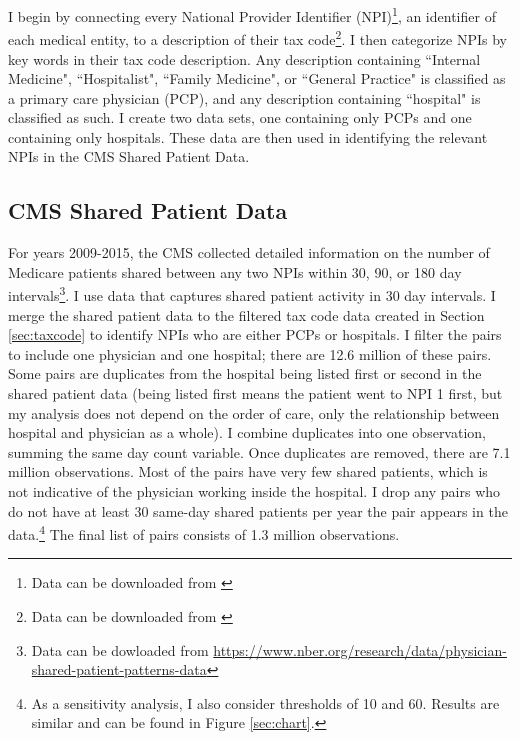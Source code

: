\documentclass[12pt]{article}
\begin{document}
I begin by connecting every National Provider Identifier (NPI)\footnote{Data can be downloaded from \hyperlink{https://download.cms.gov/nppes/NPI/Files.html}{}}, an identifier of each medical entity, to a description of their tax code\footnote{Data can be downloaded from \hyperlink{https://nucc.org/index.php/code-sets-mainmenu-41/provider-taxonomy-mainmenu-40/pdf-mainmenu-53}{}}. I then categorize NPIs by key words in their tax code description. Any description containing ``Internal Medicine", ``Hospitalist", ``Family Medicine", or ``General Practice" is classified as a primary care physician (PCP), and any description containing ``hospital" is classified as such. I create two data sets, one containing only PCPs and one containing only hospitals. These data are then used in identifying the relevant NPIs in the CMS Shared Patient Data. 



\subsection{CMS Shared Patient Data}\label{sec:sharedpat}

For years 2009-2015, the CMS collected detailed information on the number of Medicare patients shared between any two NPIs within 30, 90, or 180 day intervals\footnote{Data can be dowloaded from \hyperlink{https://www.nber.org/research/data/physician-shared-patient-patterns-data}{https://www.nber.org/research/data/physician-shared-patient-patterns-data}}. I use data that captures shared patient activity in 30 day intervals. I merge the shared patient data to the filtered tax code data created in Section \ref{sec:taxcode} to identify NPIs who are either PCPs or hospitals. I filter the pairs to include one physician and one hospital; there are 12.6 million of these pairs. Some pairs are duplicates from the hospital being listed first or second in the shared patient data (being listed first means the patient went to NPI 1 first, but my analysis does not depend on the order of care, only the relationship between hospital and physician as a whole). I combine duplicates into one observation, summing the same day count variable. Once duplicates are removed, there are 7.1 million observations. Most of the pairs have very few shared patients, which is not indicative of the physician working inside the hospital. I drop any pairs who do not have at least 30 same-day shared patients per year the pair appears in the data.\footnote{As a sensitivity analysis, I also consider thresholds of 10 and 60. Results are similar and can be found in Figure \ref{sec:chart}.} The final list of pairs consists of 1.3 million observations. 
\end{document}
